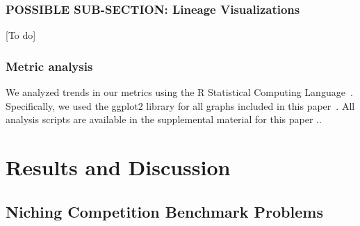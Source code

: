 \documentclass[letterpaper]{article}
\begin{document}
\subsubsection{POSSIBLE SUB-SECTION: Lineage Visualizations}

[To do]

\subsubsection{Metric analysis}

We analyzed trends in our metrics using the R Statistical Computing Language~\citep{r_core_team_r:_2017}. Specifically, we used the ggplot2 library for all graphs included in this paper~\citep{wickham_ggplot2:_2009}. All analysis scripts are available in the supplemental material for this paper \citep{supplement}..


\section{Results and Discussion}

\subsection{Niching Competition Benchmark Problems}
\end{document}

